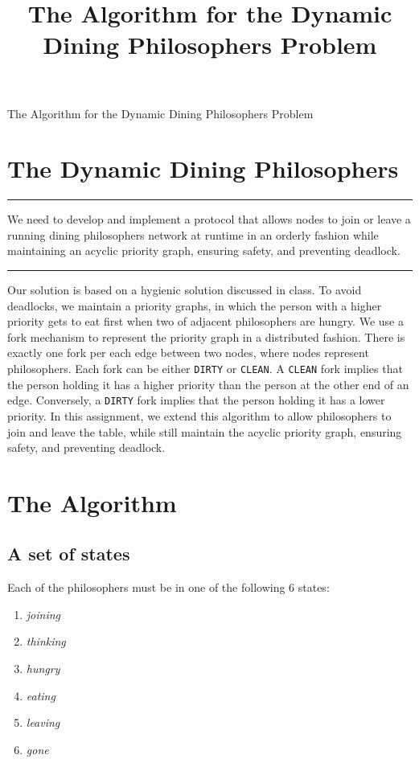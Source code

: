 \documentclass[11pt]{article}
\title{The Algorithm for the Dynamic Dining Philosophers Problem}
\newenvironment{problem}[1]{
\medskip \hrule \medskip
\noindent {\bf Problem #1.}
}{
\medskip \hrule \medskip
}
\begin{document}
\pagestyle{fancy}


\vspace*{0.1in}
\begin{center} \Large The Algorithm for the Dynamic Dining Philosophers Problem \end{center}

\section{The Dynamic Dining Philosophers}
\begin{problem}{Statement}
We need to develop and implement a protocol that allows nodes to join or leave a running dining philosophers network at runtime in an orderly fashion while maintaining an acyclic priority graph, ensuring safety, and preventing deadlock.
\end{problem}

Our solution is based on a hygienic solution discussed in class. To avoid deadlocks, we maintain a priority graphs, in which the person with a higher priority gets to eat first when two of adjacent philosophers are hungry. We use a fork mechanism to represent the priority graph in a distributed fashion. There is exactly one fork per each edge between two nodes, where nodes represent philosophers. Each fork can be either \texttt{DIRTY} or \texttt{CLEAN}. A \texttt{CLEAN} fork implies that the person holding it has a higher priority than the person at the other end of an edge. Conversely, a \texttt{DIRTY} fork implies that the person holding it has a lower priority. In this assignment, we extend this algorithm to allow philosophers to join and leave the table, while still maintain the acyclic priority graph, ensuring safety, and preventing deadlock.


\section{The Algorithm}
\subsection{A set of states}
Each of the philosophers must be in one of the following 6 states:
\begin{enumerate}
\item \textit{joining}
\item \textit{thinking}
\item \textit{hungry}
\item \textit{eating}
\item \textit{leaving}
\item \textit{gone}
\end{enumerate}
\end{document}
